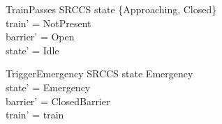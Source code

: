 \documentclass{article}
\begin{document}
\begin{schema}{TrainPasses}
  \Delta SRCCS
\where
  state \in \{Approaching, Closed\} \\
  train' = NotPresent \\
  barrier' = Open \\
  state' = Idle
\end{schema}

\begin{schema}{TriggerEmergency}
  \Delta SRCCS
\where
  state \neq Emergency \\
  state' = Emergency \\
  barrier' = ClosedBarrier \\
  train' = train
\end{schema}
\end{document}
